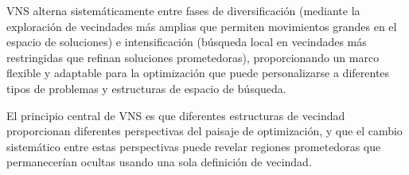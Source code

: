 VNS alterna sistemáticamente entre fases de diversificación (mediante la exploración de vecindades más amplias que permiten movimientos grandes en el espacio de soluciones) e intensificación (búsqueda local en vecindades más restringidas que refinan soluciones prometedoras), proporcionando un marco flexible y adaptable para la optimización que puede personalizarse a diferentes tipos de problemas y estructuras de espacio de búsqueda.

El principio central de VNS es que diferentes estructuras de vecindad proporcionan diferentes perspectivas del paisaje de optimización, y que el cambio sistemático entre estas perspectivas puede revelar regiones prometedoras que permanecerían ocultas usando una sola definición de vecindad.

\begin{table}[htbp]
\centering
{}
\end{table}
